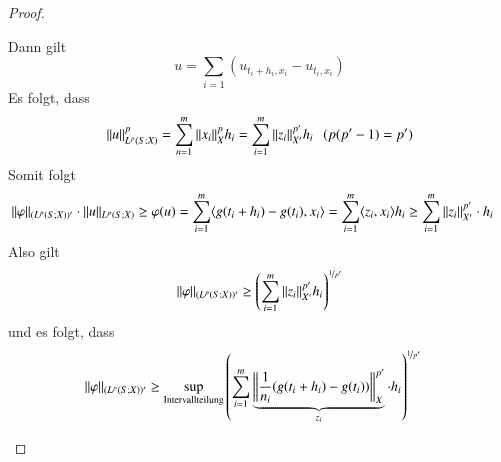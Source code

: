 \begin{proof}
\begin{enumerate}
\[        \]
        Dann gilt
        \[
            u= \sum_{i=1}\left( u_{t_i+h_i,x_i}-u_{t_i,x_i} \right)
        \]
        Es folgt, dass
        \[
            \|u\|^p_{L^p(S;X)} = \sum_{n=1}^m \|x_i\|^p_X h_i = \sum_{i=1}^m \|z_i\|_{X'}^{p'} h _i
            \hspace{.25cm} (p(p'-1)=p')
        \]
        Somit folgt
        \begin{align*}
            \|\varphi\|_{(L^p(S;X))'} \cdot \|u\|_{L^p(S;X)} &\geq \varphi (u) 
                = \sum_{i=1}^m \langle g(t_i+h_i)- g(t_i), x_i\rangle = \sum_{i=1}^m \langle z_i,x_i\rangle h_i
                \geq \sum_{i=1}^m \|z_i\|_{X'}^{p'} \cdot h_i
        \end{align*}
        Also gilt
        \[
            \|\varphi\|_{(L^p(S;X))'} \geq \left( \sum_{i=1}^m \|z_i\|_{X'}^{p'} h_i \right)^{\nicefrac1{p'}}
        \]
        und es folgt, dass
        \begin{align}\label{28}
            \|\varphi\|_{(L^p(S;X))'} &\geq \sup_{\text{Intervallteilung}} \left( \sum_{i=1}^m
            \underbrace{\left\|\frac1{n_i}(g(t_i+h_i)-g(t_i))\right\|_X^{p'}}_{z_i}\cdot h_i\right)
            ^{\nicefrac1{p'}}
        \end{align}
    \end{enumerate}
\end{proof}
